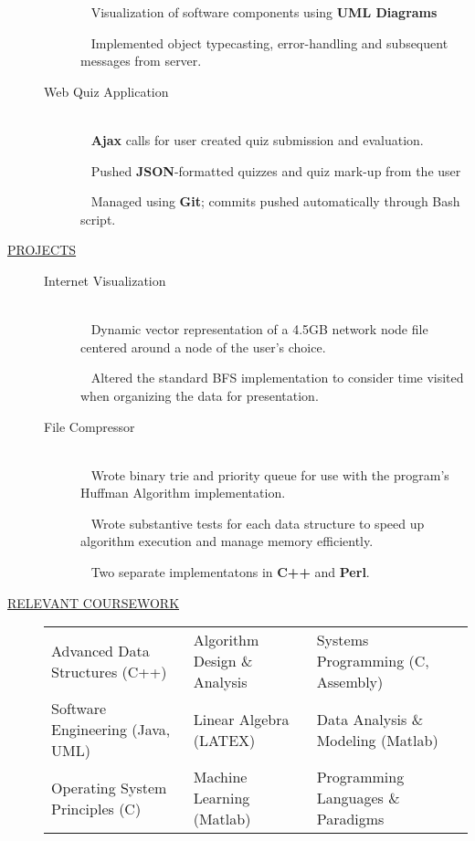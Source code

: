 \documentclass[11pt]{article}
\begin{document}
\begin{description}
\begin{description}
            \textbullet ~ Visualization of software components using {\bf UML Diagrams}

            \textbullet ~ Implemented object typecasting, error-handling and subsequent messages from server.

		\item[Web Quiz Application] \hfill \\
            \textbullet ~ {\bf Ajax} calls for user created quiz submission and evaluation.

            \textbullet ~ Pushed {\bf JSON}-formatted quizzes and quiz mark-up from the user

            \textbullet ~ Managed using {\bf Git}; commits pushed automatically through Bash script.

        \end{description}


    \item[\underline{PROJECTS}] \hfill
        \begin{description}
        \item[Internet Visualization] \hfill \\
		    \textbullet ~ Dynamic vector representation of a 4.5GB network node file centered around a
            node of the user's choice.

            \textbullet ~ Altered the standard BFS implementation to consider time visited when
            organizing the data for presentation.

		\item[File Compressor] \hfill \\
            \textbullet ~ Wrote binary trie and priority queue for use with the program's Huffman Algorithm implementation.

            \textbullet ~ Wrote substantive tests for each data
                structure to speed up algorithm execution and manage memory efficiently.

            \textbullet ~ Two separate implementatons in {\bf C++} and {\bf Perl}.

		\end{description}

    \item[\underline{RELEVANT COURSEWORK}]\hfill

        \begin{tabular}{l|l|l}
            Advanced Data Structures (C++)& Algorithm Design \& Analysis & Systems Programming (C, Assembly)\\
         Software Engineering (Java, UML) & Linear Algebra (LATEX) &  Data Analysis \& Modeling (Matlab) \\
              Operating System Principles (C) & Machine Learning (Matlab) & Programming Languages \& Paradigms\\
        \end{tabular}


\end{description}
\end{document}

